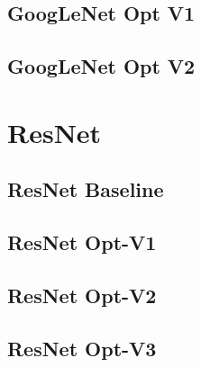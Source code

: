 \subsection{GoogLeNet Opt V1}
\subsection{GoogLeNet Opt V2}

\section{ResNet}
\subsection{ResNet Baseline}
\subsection{ResNet Opt-V1}
\subsection{ResNet Opt-V2}
\subsection{ResNet Opt-V3}
